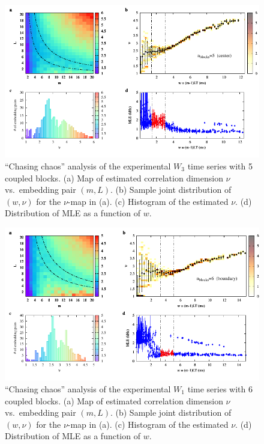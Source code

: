\begin{appendices}
\begin{figure}[!htbp]
    \centering
    \includegraphics[width=\linewidth]{../blocks/5_blocks/middle/2e5_points/plots/chaos_low.pdf}
    \caption{``Chasing chaos'' analysis of the experimental $W_3$ time series with 5 coupled blocks.
    (a) Map of estimated correlation dimension $\nu$ vs.\ embedding pair $(m, L)$.
    (b) Sample joint distribution of $(w,\nu)$ for the $\nu$-map in (a).
    (c) Histogram of the estimated $\nu$. (d) Distribution of MLE as a function of $w$.
    } 
\end{figure}

\begin{figure}[!htbp]
    \centering
    \includegraphics[width=\linewidth]{../blocks/6_blocks/2e5_points/plots/chaos_low.pdf}
    \caption{``Chasing chaos'' analysis of the experimental $W_1$ time series with 6 coupled blocks.
    (a) Map of estimated correlation dimension $\nu$ vs.\ embedding pair $(m, L)$.
    (b) Sample joint distribution of $(w,\nu)$ for the $\nu$-map in (a).
    (c) Histogram of the estimated $\nu$. (d) Distribution of MLE as a function of $w$.
    } 
\end{figure}


\end{appendices}
